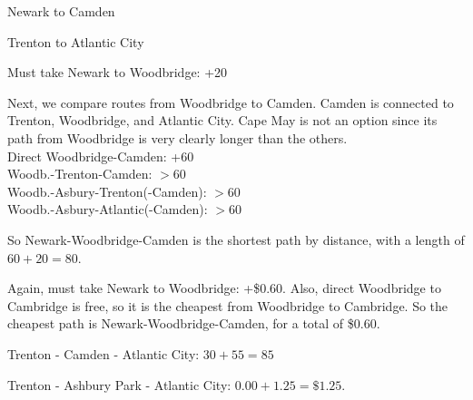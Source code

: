 \documentclass[12pt]{exam}
\begin{document}
\begin{qparts}
    \item Newark to Camden
    \item Trenton to Atlantic City
\end{qparts}

\begin{solution}
    \begin{qparts}
        \item \begin{qsubparts}
            \item Must take Newark to Woodbridge: +20 \\
            \par Next, we compare routes from Woodbridge to Camden. Camden is connected to Trenton, Woodbridge, and Atlantic City. Cape May is not an option since its path from Woodbridge is very clearly longer than the others. \\
            Direct Woodbridge-Camden: +60 \\
            Woodb.-Trenton-Camden: $>60$ \\
            Woodb.-Asbury-Trenton(-Camden): $>60$ \\
            Woodb.-Asbury-Atlantic(-Camden): $>60$ \\
            \par So Newark-Woodbridge-Camden is the shortest path by distance, with a length of $60+20 = 80$.
            \item Again, must take Newark to Woodbridge: +\$0.60. Also, direct Woodbridge to Cambridge is free, so it is the cheapest from Woodbridge to Cambridge. So the cheapest path is Newark-Woodbridge-Camden, for a total of \$0.60.
        \end{qsubparts}
        \item \begin{qsubparts}
            \item Trenton - Camden - Atlantic City: $30 + 55 = 85$
            \item Trenton - Ashbury Park - Atlantic City: $0.00 + 1.25 = \$ 1.25$.
        \end{qsubparts}
    \end{qparts}
\end{solution}

\newpage
\end{document}
